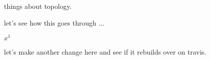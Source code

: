 things about topology.

let's see how this goes through ...

$x^1$

let's make another change here and see if it rebuilds over on travis.